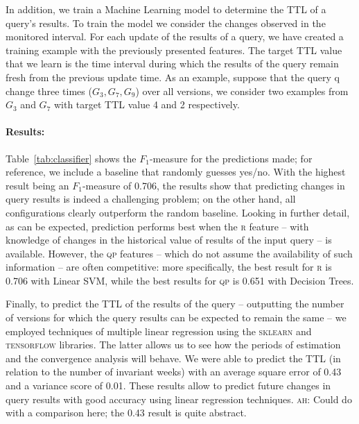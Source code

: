 \documentclass[runningheads]{llncs}
\newcommand{\ah}[1]{{\color{blue}\textsc{ah:} #1}}
\begin{document}

In addition, we train a Machine Learning model to determine the TTL of a query's results. To train the model we consider the changes observed in the monitored interval. For each update of the results of a query, we have created a training example with the previously presented features. The target TTL value that we learn is the time interval during which the results of the query remain fresh from the previous update time. As an example, suppose that the query q change three times ($G_{3}, G_{7}, G_{9}$) over all versions, we consider two examples from $G_{3}$ and $G_{7}$ with target TTL value 4 and 2 respectively.

\paragraph{Results:} Table~\ref{tab:classifier} shows the $F_1$-measure for the predictions made; for reference, we include a baseline that randomly guesses yes/no. With the highest result being an $F_1$-measure of 0.706, the results show that predicting changes in query results is indeed a challenging problem; on the other hand, all configurations clearly outperform the random baseline. Looking in further detail, as can be expected, prediction performs best when the \textsc{r} feature -- with knowledge of changes in the historical value of results of the input query -- is available. However, the \textsc{qp} features -- which do not assume the availability of such information -- are often competitive: more specifically, the best result for \textsc{r} is 0.706 with Linear SVM, while the best results for \textsc{qp} is 0.651 with Decision Trees. 

Finally, to predict the TTL of the results of the query -- outputting the number of versions for which the query results can be expected to remain the same -- we employed techniques of multiple linear regression using the \textsc{sklearn} and \textsc{tensorflow} libraries. The latter allows us to see how the periods of estimation and the convergence analysis will behave. We were able to predict the TTL (in relation to the number of invariant weeks) with an average square error of 0.43 and a variance score of 0.01. These results allow to predict future changes in query results with good accuracy using linear regression techniques. \ah{Could do with a comparison here; the 0.43 result is quite abstract.}
\end{document}
